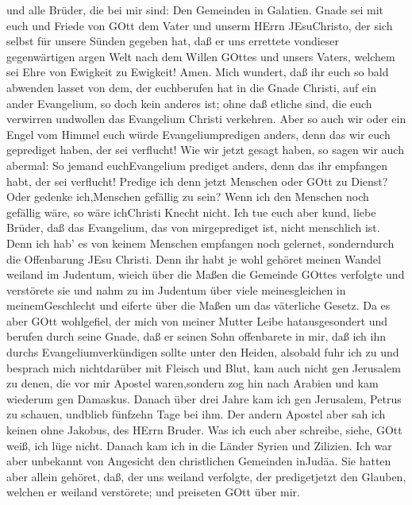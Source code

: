  und alle Brüder, die bei mir sind: Den Gemeinden in
Galatien.  Gnade sei mit euch und Friede von GOtt dem Vater
und unserm HErrn JEsuChristo,  der sich selbst für unsere
Sünden gegeben hat, daß er uns errettete vondieser gegenwärtigen argen
Welt nach dem Willen GOttes und unsers Vaters,  welchem sei
Ehre von Ewigkeit zu Ewigkeit! Amen.  Mich wundert, daß ihr
euch so bald abwenden lasset von dem, der euchberufen hat in die Gnade
Christi, auf ein ander Evangelium,  so doch kein anderes
ist; ohne daß etliche sind, die euch verwirren undwollen das Evangelium
Christi verkehren.  Aber so auch wir oder ein Engel vom
Himmel euch würde Evangeliumpredigen anders, denn das wir euch
geprediget haben, der sei verflucht!  Wie wir jetzt gesagt
haben, so sagen wir auch abermal: So jemand euchEvangelium prediget
anders, denn das ihr empfangen habt, der sei verflucht! 
Predige ich denn jetzt Menschen oder GOtt zu Dienst? Oder gedenke
ich,Menschen gefällig zu sein? Wenn ich den Menschen noch gefällig wäre,
so wäre ichChristi Knecht nicht.  Ich tue euch aber kund,
liebe Brüder, daß das Evangelium, das von mirgeprediget ist, nicht
menschlich ist.  Denn ich hab' es von keinem Menschen
empfangen noch gelernet, sonderndurch die Offenbarung JEsu Christi.
 Denn ihr habt je wohl gehöret meinen Wandel weiland im
Judentum, wieich über die Maßen die Gemeinde GOttes verfolgte und
verstörete sie  und nahm zu im Judentum über viele
meinesgleichen in meinemGeschlecht und eiferte über die Maßen um das
väterliche Gesetz.  Da es aber GOtt wohlgefiel, der mich
von meiner Mutter Leibe hatausgesondert und berufen durch seine Gnade,
 daß er seinen Sohn offenbarete in mir, daß ich ihn durchs
Evangeliumverkündigen sollte unter den Heiden, alsobald fuhr ich zu und
besprach mich nichtdarüber mit Fleisch und Blut,  kam auch
nicht gen Jerusalem zu denen, die vor mir Apostel waren,sondern zog hin
nach Arabien und kam wiederum gen Damaskus.  Danach über
drei Jahre kam ich gen Jerusalem, Petrus zu schauen, undblieb fünfzehn
Tage bei ihm.  Der andern Apostel aber sah ich keinen ohne
Jakobus, des HErrn Bruder.  Was ich euch aber schreibe,
siehe, GOtt weiß, ich lüge nicht.  Danach kam ich in die
Länder Syrien und Zilizien.  Ich war aber unbekannt von
Angesicht den christlichen Gemeinden inJudäa.  Sie hatten
aber allein gehöret, daß, der uns weiland verfolgte, der predigetjetzt
den Glauben, welchen er weiland verstörete;  und preiseten
GOtt über mir.

